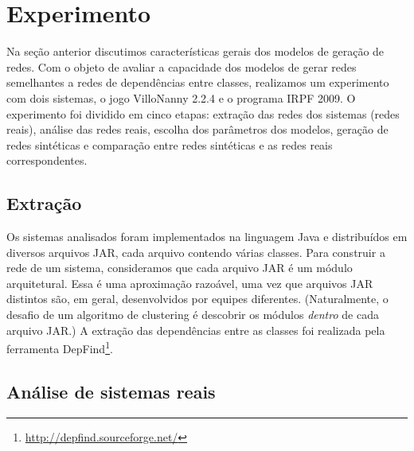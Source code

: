 \documentclass{acm_proc_article-sp}
\begin{document}

\section{Experimento} %

Na seção anterior discutimos características gerais dos modelos de geração de redes. Com o objeto de avaliar a capacidade dos modelos de gerar redes semelhantes a redes de dependências entre classes, realizamos um experimento com dois sistemas, o jogo VilloNanny 2.2.4 e o programa IRPF 2009. O experimento foi dividido em cinco etapas: extração das redes dos sistemas (redes reais), análise das redes reais, escolha dos parâmetros dos modelos, geração de redes sintéticas e comparação entre redes sintéticas e as redes reais correspondentes. 

\subsection{Extração}

Os sistemas analisados foram implementados na linguagem Java e distribuídos em diversos arquivos JAR, cada arquivo contendo várias classes. Para construir a rede de um sistema, consideramos que cada arquivo JAR é um módulo arquitetural. Essa é uma aproximação razoável, uma vez que arquivos JAR distintos são, em geral, desenvolvidos por equipes diferentes. (Naturalmente, o desafio de um algoritmo de clustering é descobrir os módulos \emph{dentro} de cada arquivo JAR.) A extração das dependências entre as classes foi realizada pela ferramenta DepFind\footnote{\url{http://depfind.sourceforge.net/}}.


\subsection{Análise de sistemas reais}

\end{document}
